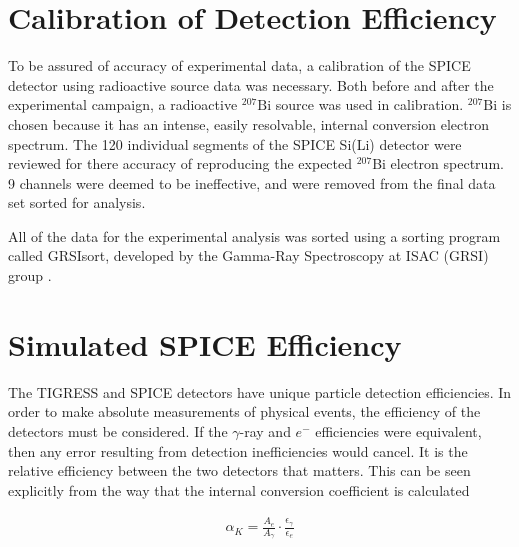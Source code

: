 \section{Calibration of Detection Efficiency}
\label{sec: Calibration of Detection Efficiency}

To be assured of accuracy of experimental data, a calibration of the SPICE detector using radioactive source data was necessary. Both before and after the experimental campaign, a radioactive $^{207}\mathrm{Bi}$ source was used in calibration. $^{207}\mathrm{Bi}$ is chosen because it has an intense, easily resolvable, internal conversion electron spectrum. The 120 individual segments of the SPICE Si(Li) detector were reviewed for there accuracy of reproducing the expected $^{207}$Bi electron spectrum. 9 channels were deemed to be ineffective, and were removed from the final data set sorted for analysis.

All of the data for the experimental analysis was sorted using a sorting program called GRSIsort, developed by the Gamma-Ray Spectroscopy at ISAC (GRSI) group \cite{GRSIsort}. 

\section{Simulated SPICE Efficiency}
\label{sec: Simulated SPICE Efficiency}

The TIGRESS and SPICE detectors have unique particle detection efficiencies. In order to make absolute measurements of physical events, the efficiency of the detectors must be considered. If the $\gamma$-ray and $e^-$ efficiencies were equivalent, then any error resulting from detection inefficiencies would cancel. It is the relative efficiency between the two detectors that matters. This can be seen explicitly from the way that the internal conversion coefficient is calculated

\begin{gather}
\alpha_K= \frac{A_e}{A_\gamma} \cdot \frac{\epsilon_\gamma}{\epsilon_e}
\label{equation: ICC and Efficiency}
\end{gather}


